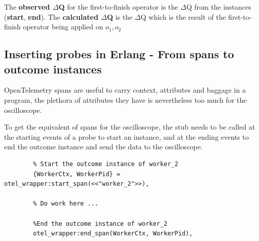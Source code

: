     The \textbf{observed $\Delta$Q} for the first-to-finish operator is the $\Delta$Q from the instances (\textbf{start}, \textbf{end}). The \textbf{calculated $\Delta$Q} is the $\Delta$Q which is the result of the first-to-finish operator being applied on $o_1, o_2$
        
    \subsection{Inserting probes in Erlang - From spans to outcome instances}
        OpenTelemetry spans are useful to carry context, attributes and baggage in a program, the plethora of attributes they have is nevertheless too much for the oscilloscope.

        To get the equivalent of spans for the oscilloscope, the stub needs to be called at the starting events of a probe to start an instance, and at the ending events to end the outcome instance and send the data to the oscilloscope.

        \begin{verbatim}
        % Start the outcome instance of worker_2 
        {WorkerCtx, WorkerPid} = otel_wrapper:start_span(<<"worker_2">>),
        
        % Do work here ...

        %End the outcome instance of worker_2
        otel_wrapper:end_span(WorkerCtx, WorkerPid),
        \end{verbatim}
